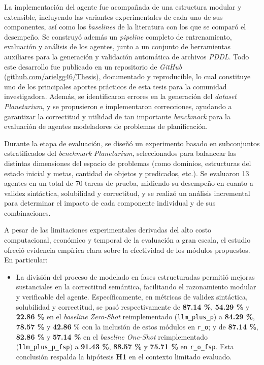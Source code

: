 \begin{conclusions}
La implementación del agente fue acompañada de una estructura modular y extensible, incluyendo las variantes experimentales de cada uno de sus componentes, así como los \textit{baselines} de la literatura con los que se comparó el desempeño. Se construyó además un \textit{pipeline} completo de entrenamiento, evaluación y análisis de los agentes, junto a un conjunto de herramientas auxiliares para la generación y validación automática de archivos \textit{PDDL}. Todo este desarrollo fue publicado en un repositorio de \textit{GitHub} (\href{https://github.com/arielgg46/Thesis}{github.com/arielgg46/Thesis}), documentado y reproducible, lo cual constituye uno de los principales aportes prácticos de esta tesis para la comunidad investigadora. Además, se identificaron errores en la generación del \textit{dataset Planetarium}, y se propusieron e implementaron correcciones, ayudando a garantizar la correctitud y utilidad de tan importante \textit{benchmark} para la evaluación de agentes modeladores de problemas de planificación.

Durante la etapa de evaluación, se diseñó un experimento basado en subconjuntos estratificados del \textit{benchmark Planetarium}, seleccionados para balancear las distintas dimensiones del espacio de problemas (como dominios, estructuras del estado inicial y metas, cantidad de objetos y predicados, etc.). Se evaluaron 13 agentes en un total de 70 tareas de prueba, midiendo su desempeño en cuanto a validez sintáctica, solubilidad y correctitud, y se realizó un análisis incremental para determinar el impacto de cada componente individual y de sus combinaciones.

A pesar de las limitaciones experimentales derivadas del alto costo computacional, económico y temporal de la evaluación a gran escala, el estudio ofreció evidencia empírica clara sobre la efectividad de los módulos propuestos. En particular:

\begin{itemize}
    \item La división del proceso de modelado en fases estructuradas permitió mejoras sustanciales en la correctitud semántica, facilitando el razonamiento modular y verificable del agente. Específicamente, en métricas de validez sintáctica, solubilidad y correctitud, se pasó respectivamente de \textbf{\textcolor[rgb]{0.0,0.87,0.0}{87.14 \%}}, \textbf{\textcolor[rgb]{0.0,0.54,0.0}{54.29 \%}} y \textbf{\textcolor[rgb]{0.0,0.23,0.0}{22.86 \%}} en el \textit{baseline Zero-Shot} reimplementado (\texttt{llm\_plus\_p}) a \textbf{\textcolor[rgb]{0.0,0.84,0.0}{84.29 \%}}, \textbf{\textcolor[rgb]{0.0,0.79,0.0}{78.57 \%}} y \textbf{\textcolor[rgb]{0.0,0.43,0.0}{42.86}} \% con la inclusión de estos módulos en \texttt{r\_o}; y de \textbf{\textcolor[rgb]{0.0,0.87,0.0}{87.14 \%}}, \textbf{\textcolor[rgb]{0.0,0.83,0.0}{82.86 \%}} y \textbf{\textcolor[rgb]{0.0,0.57,0.0}{57.14 \%}} en el \textit{baseline One-Shot} reimplementado (\texttt{llm\_plus\_p\_fsp}) a \textbf{\textcolor[rgb]{0.0,0.91,0.0}{91.43 \%}}, \textbf{\textcolor[rgb]{0.0,0.89,0.0}{88.57 \%}} y \textbf{\textcolor[rgb]{0.0,0.76,0.0}{75.71 \%}} en \texttt{r\_o\_fsp}. Esta conclusión respalda la hipótesis \textbf{H1} en el contexto limitado evaluado.


\end{itemize}
\end{conclusions}
